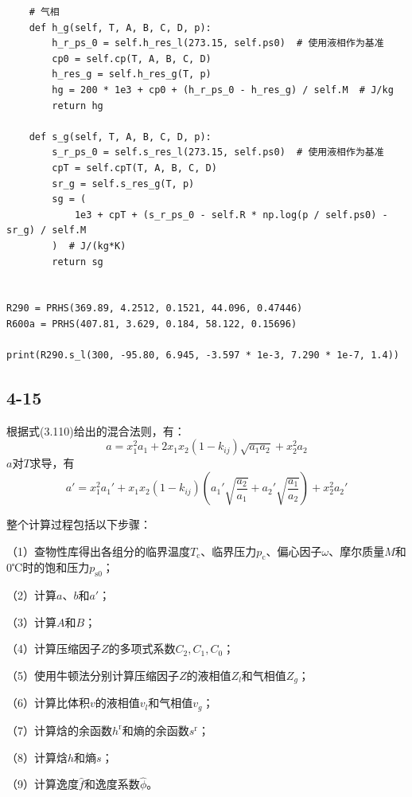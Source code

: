 \documentclass[12pt,a4paper]{article}
\begin{document}
\begin{lstlisting}
    # 气相
    def h_g(self, T, A, B, C, D, p):
        h_r_ps_0 = self.h_res_l(273.15, self.ps0)  # 使用液相作为基准
        cp0 = self.cp(T, A, B, C, D)
        h_res_g = self.h_res_g(T, p)
        hg = 200 * 1e3 + cp0 + (h_r_ps_0 - h_res_g) / self.M  # J/kg
        return hg

    def s_g(self, T, A, B, C, D, p):
        s_r_ps_0 = self.s_res_l(273.15, self.ps0)  # 使用液相作为基准
        cpT = self.cpT(T, A, B, C, D)
        sr_g = self.s_res_g(T, p)
        sg = (
            1e3 + cpT + (s_r_ps_0 - self.R * np.log(p / self.ps0) - sr_g) / self.M
        )  # J/(kg*K)
        return sg


R290 = PRHS(369.89, 4.2512, 0.1521, 44.096, 0.47446)
R600a = PRHS(407.81, 3.629, 0.184, 58.122, 0.15696)

print(R290.s_l(300, -95.80, 6.945, -3.597 * 1e-3, 7.290 * 1e-7, 1.4))

\end{lstlisting}

\subsection*{4-15}
根据式(3.110)给出的混合法则，有：
\begin{equation*}
    a = x_1^2 a_1  + 2 x_1 x_2 (1 - k_{ij}) \sqrt{a_1 a_2} + x_2^2 a_2
\end{equation*}
$a$对$T$求导，有
\begin{equation*}
    a'=x_1^2 a_1' + x_1 x_2 (1-k_{ij})(a_1'\sqrt{\frac{a_2}{a_1}} + a_2'\sqrt{\frac{a_1}{a_2}}) + x_2^2 a_2'
\end{equation*}

整个计算过程包括以下步骤：

（1）查物性库得出各组分的临界温度$T_\mathrm{c}$、临界压力$p_\mathrm{c}$、偏心因子$\omega$、摩尔质量$M$和0℃时的饱和压力$p_\mathrm{s0}$；

（2）计算$a$、$b$和$a'$；

（3）计算$A$和$B$；

（4）计算压缩因子$Z$的多项式系数$C_2, C_1, C_0$；

（5）使用牛顿法分别计算压缩因子$Z$的液相值$Z_l$和气相值$Z_g$；

（6）计算比体积$v$的液相值$v_l$和气相值$v_g$；

（7）计算焓的余函数$h^\mathrm{r}$和熵的余函数$s^\mathrm{r}$；

（8）计算焓$h$和熵$s$；

（9）计算逸度$\hat{f}$和逸度系数$\hat{\phi}$。
\end{document}
